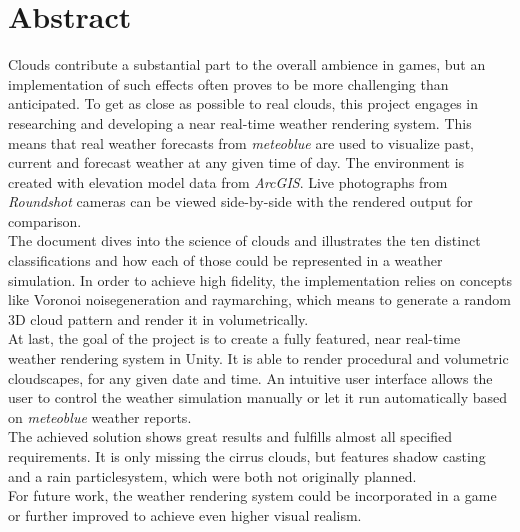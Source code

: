 \section*{Abstract}
Clouds contribute a substantial part to the overall ambience in games, but an implementation of such effects often proves to be more challenging than anticipated.
To get as close as possible to real clouds, this project engages in researching and developing a near real-time weather rendering system.
This means that real weather forecasts from \emph{meteoblue} are used to visualize past, current and forecast weather at any given time of day.
The environment is created with elevation model data from \emph{ArcGIS}. Live photographs from \emph{Roundshot} cameras can be viewed side-by-side with the rendered output for comparison.
\\
The document dives into the science of clouds and illustrates the ten distinct classifications and how each of those could be represented in a weather simulation. 
In order to achieve high fidelity, the implementation relies on concepts like Voronoi \gls{noisegeneration} and \gls{raymarching}, which means to generate a random 3D cloud pattern and render it in volumetrically.
\\
At last, the goal of the project is to create a fully featured, near real-time weather rendering system in Unity.
It is able to render \gls{procedural} and volumetric cloudscapes, for any given date and time.
An intuitive user interface allows the user to control the weather simulation manually or let it run automatically based on \emph{meteoblue} weather reports.
\\
The achieved solution shows great results and fulfills almost all specified requirements.
It is only missing the cirrus clouds, but features shadow casting and a rain \gls{particlesystem}, which were both not originally planned.
\\
For future work, the weather rendering system could be incorporated in a game or further improved to achieve even higher visual realism.